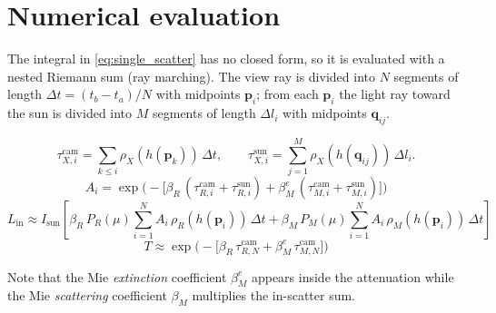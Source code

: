 \documentclass[11pt]{article}
\newcommand{\vect}[1]{\mathbf{#1}}
\begin{document}
\section{Numerical evaluation}

The integral in \eqref{eq:single_scatter} has no closed form, so it is
evaluated with a nested Riemann sum (ray marching). The view ray is divided
into $N$ segments of length $\Delta t = (t_b - t_a)/N$ with midpoints
$\vect{p}_i$; from each $\vect{p}_i$ the light ray toward the sun is divided
into $M$ segments of length $\Delta l_i$ with midpoints $\vect{q}_{ij}$.

\begin{equation}
  \tau^{\mathrm{cam}}_{X,i} = \sum_{k \le i} \rho_X(h(\vect{p}_k))\,\Delta t, \qquad
  \tau^{\mathrm{sun}}_{X,i} = \sum_{j=1}^{M} \rho_X(h(\vect{q}_{ij}))\,\Delta l_i .
\end{equation}
\begin{equation}
  A_i = \exp\!\Big(-\big[
        \beta_R\,(\tau^{\mathrm{cam}}_{R,i} + \tau^{\mathrm{sun}}_{R,i}) +
        \beta_M^{e}\,(\tau^{\mathrm{cam}}_{M,i} + \tau^{\mathrm{sun}}_{M,i})
        \big]\Big)
\end{equation}
\begin{equation}
  L_{\mathrm{in}} \approx I_{\mathrm{sun}}
  \left[
    \beta_R\, P_R(\mu) \sum_{i=1}^{N} A_i\, \rho_R(h(\vect{p}_i))\,\Delta t
  + \beta_M\, P_M(\mu) \sum_{i=1}^{N} A_i\, \rho_M(h(\vect{p}_i))\,\Delta t
  \right]
\end{equation}
\begin{equation}
  T \approx \exp\!\Big(-\big[\beta_R\,\tau^{\mathrm{cam}}_{R,N} +
                            \beta_M^{e}\,\tau^{\mathrm{cam}}_{M,N}\big]\Big)
\end{equation}

Note that the Mie \emph{extinction} coefficient $\beta_M^e$ appears inside the
attenuation while the Mie \emph{scattering} coefficient $\beta_M$ multiplies the
in-scatter sum.
\end{document}
